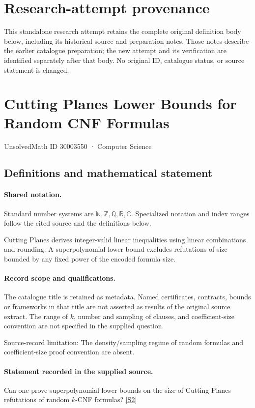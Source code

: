 \documentclass[11pt]{article}
\begin{document}
\section*{Research-attempt provenance}
This standalone research attempt retains the complete original definition body below,
including its historical source and preparation notes. Those notes describe the
earlier catalogue preparation; the new attempt and its verification are identified
separately after that body. No original ID, catalogue status, or source statement is changed.

\section{Cutting Planes Lower Bounds for Random CNF Formulas}\label{30003550}
{\small UnsolvedMath ID 30003550 · Computer Science}
\subsection{Definitions and mathematical statement}

\paragraph{Shared notation.}Standard number systems are $\mathbb N,\mathbb Z,\mathbb Q,\mathbb R,\mathbb C$. Specialized notation and index ranges follow the cited source and the definitions below.


Cutting Planes derives integer-valid linear inequalities using linear combinations and rounding. A superpolynomial lower bound excludes refutations of size bounded by any fixed power of the encoded formula size.
\paragraph{Record scope and qualifications.}
The catalogue title is retained as metadata. Named certificates, contracts, bounds or frameworks in that title are not asserted as results of the original source extract.
The range of $k$, number and sampling of clauses, and coefficient-size convention are not specified in the supplied question.

Source-record limitation: The density/sampling regime of random formulas and coefficient-size proof convention are absent.
\paragraph{Statement recorded in the supplied source.}
Can one prove superpolynomial lower bounds on the size of Cutting Planes refutations of random $k$-CNF formulas? \href{https://doi.org/10.4171/owr/2017/37}{[S2]}
\end{document}
